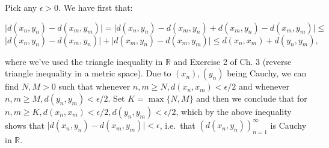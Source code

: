 \begin{solution}
    
    Pick any $\epsilon > 0$.
    We have first that:
    
    \[\lvert d(x_n, y_n) - d(x_m, y_m) \rvert = \lvert d(x_n, y_n) - d(x_m, y_n) + d(x_m, y_n) - d(x_m, y_m) \rvert \leq \]
    \[\lvert d(x_n, y_n) - d(x_m, y_n) \rvert + \lvert d(x_m, y_n) - d(x_m, y_m) \rvert \leq d(x_n, x_m) + d(y_n, y_m),\]

    where we've used the triangle inequality in $\mathbb{R}$ and Exercise 2 of Ch. 3 (reverse triangle inequality in a metric space).
    Due to $(x_n), (y_n)$ being Cauchy, we can find $N, M > 0$ such that whenever $n, m \geq N, d(x_n, x_m) < \epsilon/2$ and whenever $n, m \geq M, d(y_n, y_m) < \epsilon/2$.
    Set $K = \max\{N, M\}$ and then we conclude that for $n, m \geq K, d(x_n, x_m) < \epsilon/2, d(y_n, y_m) < \epsilon/2$, which by the above inequality shows that $\lvert d(x_n, y_n) - d(x_m, y_m) \rvert < \epsilon$, i.e.\, that $(d(x_n, y_n))_{n=1}^{\infty}$ is Cauchy in $\mathbb{R}$.
\end{solution}
